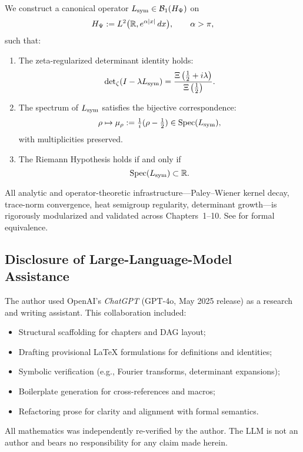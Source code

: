 \begin{tcolorbox}[colback=gray!3!white, colframe=black!75!white]
We construct a canonical operator \( L_{\mathrm{sym}} \in \mathcal{B}_1(H_{\Psi}) \) on
\[
H_{\Psi} := L^2\big(\mathbb{R}, e^{\alpha |x|} \, dx\big), \qquad \alpha > \pi,
\]
such that:
\begin{enumerate}
  \item The zeta-regularized determinant identity holds:
  \[
  \det\nolimits_{\zeta}(I - \lambda L_{\mathrm{sym}}) = \frac{\Xi\left(\tfrac{1}{2} + i\lambda\right)}{\Xi\left(\tfrac{1}{2}\right)}.
  \]
  \item The spectrum of \( L_{\mathrm{sym}} \) satisfies the bijective correspondence:
  \[
  \rho \mapsto \mu_\rho := \tfrac{1}{i}(\rho - \tfrac{1}{2}) \in \operatorname{Spec}(L_{\mathrm{sym}}),
  \]
  with multiplicities preserved.
  \item The Riemann Hypothesis holds if and only if
  \[
  \operatorname{Spec}(L_{\mathrm{sym}}) \subset \mathbb{R}.
  \]
\end{enumerate}
All analytic and operator-theoretic infrastructure—Paley–Wiener kernel decay, trace-norm convergence, heat semigroup regularity, determinant growth—is rigorously modularized and validated across Chapters~1–10. See  for formal equivalence.
\end{tcolorbox}


\subsection*{Disclosure of Large-Language-Model Assistance}

The author used OpenAI’s \emph{ChatGPT} (GPT-4o, May 2025 release) as a research and writing assistant. This collaboration included:

\begin{itemize}
  \item Structural scaffolding for chapters and DAG layout;
  \item Drafting provisional LaTeX formulations for definitions and identities;
  \item Symbolic verification (e.g., Fourier transforms, determinant expansions);
  \item Boilerplate generation for cross-references and macros;
  \item Refactoring prose for clarity and alignment with formal semantics.
\end{itemize}

All mathematics was independently re-verified by the author. The LLM is not an author and bears no responsibility for any claim made herein.
